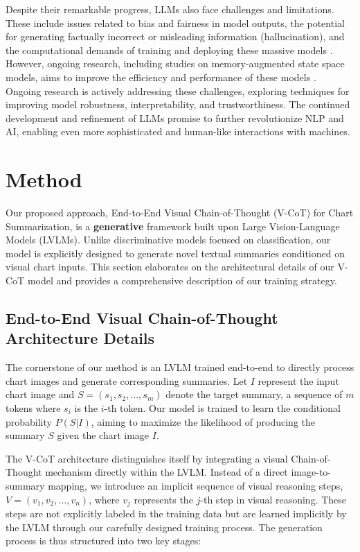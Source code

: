 Despite their remarkable progress, LLMs also face challenges and limitations. These include issues related to bias and fairness in model outputs, the potential for generating factually incorrect or misleading information (hallucination), and the computational demands of training and deploying these massive models \cite{LLMChallenges}.  However, ongoing research, including studies on memory-augmented state space models, aims to improve the efficiency and performance of these models \cite{wang2024memorymamba}. Ongoing research is actively addressing these challenges, exploring techniques for improving model robustness, interpretability, and trustworthiness. The continued development and refinement of LLMs promise to further revolutionize NLP and AI, enabling even more sophisticated and human-like interactions with machines.


\section{Method}

Our proposed approach, End-to-End Visual Chain-of-Thought (V-CoT) for Chart Summarization, is a \textbf{generative} framework built upon Large Vision-Language Models (LVLMs).  Unlike discriminative models focused on classification, our model is explicitly designed to generate novel textual summaries conditioned on visual chart inputs. This section elaborates on the architectural details of our V-CoT model and provides a comprehensive description of our training strategy.

\subsection{End-to-End Visual Chain-of-Thought Architecture Details}

The cornerstone of our method is an LVLM trained end-to-end to directly process chart images and generate corresponding summaries.  Let $I$ represent the input chart image and $S = (s_1, s_2, ..., s_m)$ denote the target summary, a sequence of $m$ tokens where $s_i$ is the $i$-th token.  Our model is trained to learn the conditional probability $P(S|I)$, aiming to maximize the likelihood of producing the summary $S$ given the chart image $I$.

The V-CoT architecture distinguishes itself by integrating a visual Chain-of-Thought mechanism directly within the LVLM.  Instead of a direct image-to-summary mapping, we introduce an implicit sequence of visual reasoning steps, $V = (v_1, v_2, ..., v_n)$, where $v_j$ represents the $j$-th step in visual reasoning.  These steps are not explicitly labeled in the training data but are learned implicitly by the LVLM through our carefully designed training process. The generation process is thus structured into two key stages:

